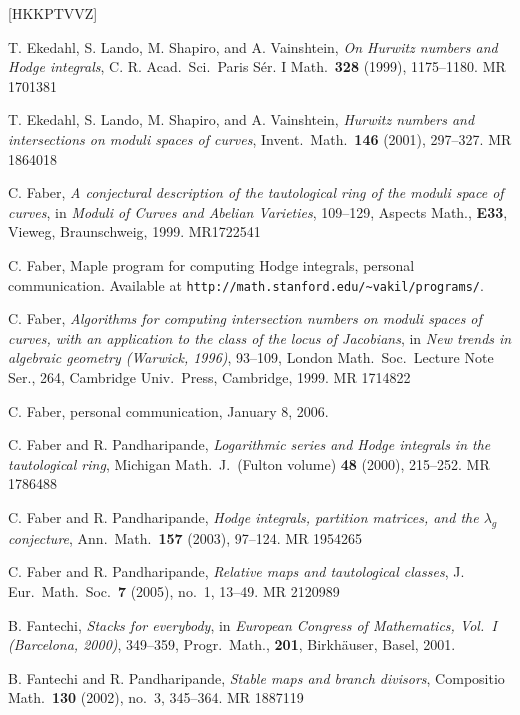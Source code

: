 \documentclass[12pt,letterpaper]{amsart}
\newcommand{\la}{\lambda}
\newcommand{\cited}{}
\newcommand{\lremind}[1]{{\bf[label:  #1]}}
\renewcommand{\lremind}[1]{{}}
\begin{document}
\begin{thebibliography}{[HKKPTVVZ]}

 T. Ekedahl, S. Lando, M. Shapiro, and A. Vainshtein,
{\em On Hurwitz numbers and Hodge integrals}, C. R. Acad.\ Sci.\ 
Paris S\'{e}r. I Math.\ {\bf 328} (1999), 1175--1180. MR 1701381 \lremind{elsv1} 

 T. Ekedahl, S. Lando, M. Shapiro, and A. Vainshtein,
{\em Hurwitz numbers and intersections on moduli spaces of curves},
Invent.\ Math.\ {\bf 146} (2001), 297--327. MR 1864018 \cited

C. Faber, {\em A conjectural description
of the tautological ring of the moduli space of curves}, in 
{\em Moduli of Curves and Abelian Varieties}, 109--129, Aspects Math.,
{\bf E33}, Vieweg, Braunschweig, 1999.  MR1722541 \lremind{faber} \cited

 C. Faber, {\sc Maple} program for computing
  Hodge integrals, personal communication.  Available at
  \verb+http://math.stanford.edu/~vakil/programs/+.  \cited

 C. Faber, {\em Algorithms for computing intersection
numbers on moduli spaces of curves, with an application to the class
of the locus of Jacobians}, in {\em New trends in algebraic geometry (Warwick, 1996)}, 93--109,
London Math.\ Soc.\ Lecture Note Ser., 264, Cambridge Univ.\ Press, Cambridge, 1999.
MR 1714822
\cited

 C. Faber, personal communication, January 8, 2006.
\cited

 C. Faber and R. Pandharipande, {\em 
Logarithmic series and Hodge integrals in the tautological ring},
Michigan Math.\ J.\ (Fulton volume) {\bf 48} (2000), 215--252. MR 1786488 \cited

 C. Faber and R. Pandharipande, 
{\em Hodge integrals, partition  matrices, and the $\la_g$ conjecture},
Ann.\ Math.\ {\bf 157} (2003), 97--124. MR 1954265 \cited

 C. Faber and R. Pandharipande,
{\em Relative maps and tautological classes}, J. Eur.\ Math.\ Soc.\ {\bf 7}
(2005), no.\ 1, 13--49.  MR 2120989

 B. Fantechi, {\em Stacks for everybody},
in {\em European Congress of Mathematics, Vol.\ I (Barcelona, 2000)},
349--359, Progr.\ Math., {\bf 201}, Birkh\"auser, Basel, 2001. \cited

  B. Fantechi and R. Pandharipande, 
{\em Stable maps and branch divisors}, Compositio Math.\ {\bf 130} (2002),
no.\ 3, 345--364.  MR 1887119 \cited


\end{thebibliography}
\end{document}
